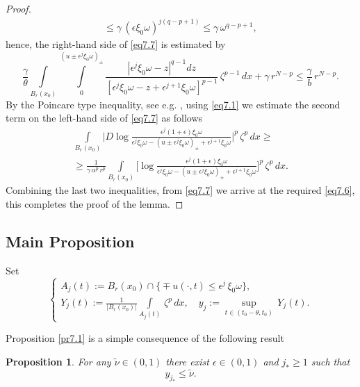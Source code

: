 \documentclass[a4paper,11pt,fullpage]{article}
\numberwithin{equation}{section}
\newtheorem{propo}{Proposition}[section]
\begin{document}
\begin{proof}
\begin{multline*}
\leqslant \gamma\,(\epsilon \xi_0 \omega)^{j(q-p+1)}\leqslant\gamma\,\omega^{q-p+1},
\end{multline*}
hence, the right-hand side of \eqref{eq7.7} is estimated by
$$\frac{\gamma}{\theta}\int\limits_{B_r(x_0)}\int\limits^{(u\pm\epsilon^j\xi_0\omega)_{\pm}}_0\frac{|\epsilon^j\xi_0\omega-z|^{q-1} dz}{[\epsilon^j\xi_0\omega-z+\epsilon^{j+1}\xi_0\omega]^{p-1}}\,\zeta^{p-1}\,dx+\gamma\,r^{N-p}\leqslant \frac{\gamma}{b}\,r^{N-p}.$$
By the Poincare type inequality, see e.g. \cite[Proposition 2.1]{DiB1}, using \eqref{eq7.1} we estimate the second term on the left-hand side 
of \eqref{eq7.7} as follows
\begin{multline*}
\int\limits_{B_r(x_0)}\Big|D \log\frac{\epsilon^j(1+\epsilon)\xi_0\omega}{\epsilon^j\xi_0\omega-(u\pm\epsilon^j\xi_0\omega)_{\pm}+
\epsilon^{j+1}\xi_0\omega}\Big|^p\,
\zeta^p\,dx\geqslant\\\geqslant \frac{1}{\gamma 
\,\alpha^p\,r^p}\int\limits_{B_r(x_0)}\Big[ \log\frac{\epsilon^j(1+\epsilon)\xi_0\omega}{\epsilon^j\xi_0\omega-(u\pm\epsilon^j\xi_0\omega)_{\pm}+
\epsilon^{j+1}\xi_0\omega}\Big]^p\,
\zeta^p\,dx.
\end{multline*}
Combining the last two inequalities, from \eqref{eq7.7} we arrive at the required \eqref{eq7.6}, this completes the proof of the lemma.
\end{proof}

\subsection{Main Proposition}
Set
\begin{equation*}
\begin{cases}
A_j(t):=B_r(x_0)\cap\big\{\mp u(\cdot, t)\leqslant \epsilon^j\,\xi_0 \omega\big\},\\
Y_j(t):=\frac{1}{|B_r(x_0)|}\int\limits_{A_j(t)}\,\zeta^p\,dx,\quad y_j:=\sup\limits_{t\in(t_0-\theta, t_0)}\,Y_j(t).
\end{cases}
\end{equation*}

Proposition \ref{pr7.1} is a simple consequence of the following result
\begin{propo}\label{pr7.2}
For any $\tilde{\nu}\in (0, 1)$ there exist $\epsilon \in (0, 1)$ and  $j_*\geqslant 1$ such that
\begin{equation}\label{eq7.8}
y_{j_*}\leqslant \tilde{\nu}.
\end{equation}
\end{propo}
\end{document}
